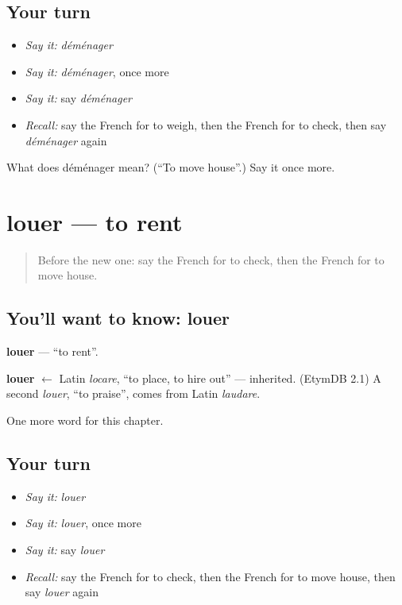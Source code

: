 \subsection*{Your turn}
\begin{itemize}
\raggedright
  \item \emph{Say it:} \emph{déménager}
  \item \emph{Say it:} \emph{déménager}, once more
  \item \emph{Say it:} say \emph{déménager}
  \item \emph{Recall:} say the French for to weigh, then the French for to check, then say \emph{déménager} again
\end{itemize}

\begin{tcolorbox}[breakable,colback=teal!4,colframe=teal!35!black,title={Before you move on}]
What does déménager mean? (\textquotedblleft{}To move house\textquotedblright{}.) Say it once more.
\end{tcolorbox}
\section[louer]{louer — to rent}

\label{lesson:FR-C235-louer}



\begin{quote}
Before the new one: say the French for to check, then the French for to move house.
\end{quote}

\subsection*{You'll want to know: louer}
\textbf{louer} — \textquotedblleft{}to rent\textquotedblright{}.

\begin{cousinweb}
\textbf{louer} $\leftarrow$ Latin \emph{locare}, \textquotedblleft{}to place, to hire out\textquotedblright{} — inherited. (EtymDB 2.1) A second \emph{louer}, \textquotedblleft{}to praise\textquotedblright{}, comes from Latin \emph{laudare}.
\end{cousinweb}

\begin{grammarlens}[title={What you've built}]
One more word for this chapter.
\end{grammarlens}

\subsection*{Your turn}
\begin{itemize}
\raggedright
  \item \emph{Say it:} \emph{louer}
  \item \emph{Say it:} \emph{louer}, once more
  \item \emph{Say it:} say \emph{louer}
  \item \emph{Recall:} say the French for to check, then the French for to move house, then say \emph{louer} again
\end{itemize}

